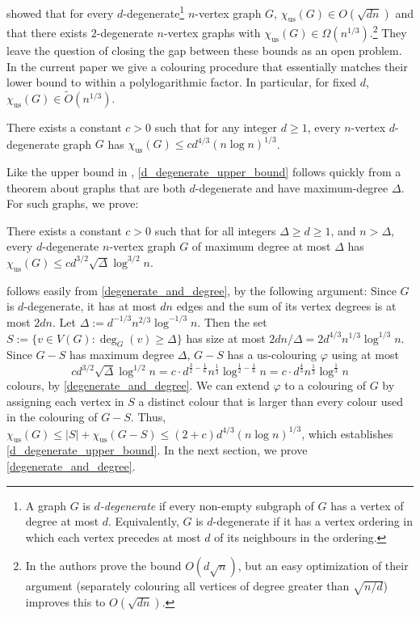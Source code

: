 \documentclass{patmorin}
\newcommand{\defin}[1]{\emph{\color{brightmaroon}#1}}
\newcommand{\trn}{\chi_{\mathrm{us}}}
\begin{document}
\citet{karpas.neiman.ea:on} showed that for every $d$-degenerate\footnote{A graph $G$ is \defin{$d$-degenerate} if every non-empty subgraph of $G$ has a vertex of degree at most $d$.  Equivalently, $G$ is $d$-degenerate if it has a vertex ordering in which each vertex precedes at most $d$ of its neighbours in the ordering.} $n$-vertex graph $G$, $\trn(G)\in O(\sqrt{dn})$ and that there exists $2$-degenerate $n$-vertex graphs with $\trn(G)\in\Omega(n^{1/3})$.\footnote{In \cite[Theorem~6.2]{karpas.neiman.ea:on} the authors prove the bound $O(d\sqrt{n})$, but an easy optimization of their argument (separately colouring all vertices of degree greater than $\sqrt{n/d}$) improves this to $O(\sqrt{dn})$.}  They leave the question of closing the gap between these bounds as an open problem. In the current paper we give a colouring procedure that essentially matches their lower bound to within a polylogarithmic factor.  In particular, for fixed $d$, $\trn(G)\in \tilde{O}(n^{1/3})$.

\begin{thm}\label{d_degenerate_upper_bound}
  There exists a constant $c>0$ such that for any integer $d\ge 1$, every $n$-vertex $d$-degenerate graph $G$ has $\trn(G) \le c d^{4/3}(n\log n)^{1/3}$.
\end{thm}

Like the upper bound in \cite{karpas.neiman.ea:on}, \cref{d_degenerate_upper_bound} follows quickly from a theorem about graphs that are both $d$-degenerate and have maximum-degree $\Delta$. For such graphs, we prove:

\begin{thm}\label{degenerate_and_degree}
  There exists a constant $c>0$ such that
  for all integers $\Delta\ge d \ge 1$, and $n> \Delta$, every $d$-degenerate $n$-vertex graph $G$ of maximum degree at most $\Delta$ has
  $\trn(G)\leq cd^{3/2}\sqrt{\Delta}\log^{3/2} n$.
\end{thm}

 follows easily from \cref{degenerate_and_degree}, by the following argument:  Since $G$ is $d$-degenerate, it has at most $dn$ edges and the sum of its vertex degrees is at most $2dn$.  Let $\Delta:=d^{-1/3}n^{2/3}\log^{-1/3} n$.  Then the set $S:=\{v\in V(G):\deg_G(v)\ge \Delta\}$ has size at most $2dn/\Delta=2d^{4/3}n^{1/3}\log^{1/3} n$.  Since $G-S$ has maximum degree $\Delta$, $G-S$ has a us-colouring $\varphi$ using at most
\[
  cd^{3/2}\sqrt{\Delta}\log^{1/2} n
  = c\cdot d^{\tfrac{3}{2}-\tfrac{1}{6}}n^{\tfrac{1}{3}}\log^{\tfrac{1}{2}-\tfrac{1}{6}} n
  = c\cdot d^{\tfrac{4}{3}}n^{\tfrac{1}{3}}\log^{\tfrac{1}{3}} n
\]
 colours, by \cref{degenerate_and_degree}. We can extend $\varphi$ to a colouring of $G$ by assigning each vertex in $S$ a distinct colour that is larger than every colour used in the colouring of $G-S$.  Thus, $\trn(G)\le |S|+\trn(G-S)\le (2+c)d^{4/3}(n\log n)^{1/3}$, which establishes \cref{d_degenerate_upper_bound}.  In the next section, we prove \cref{degenerate_and_degree}.
\end{document}
